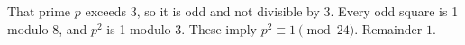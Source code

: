 That prime $p$ exceeds 3, so it is odd and not divisible by 3. Every odd square is 1 modulo 8, and $p^2$ is 1 modulo 3. These imply $p^2\equiv1\pmod{24}$. Remainder $\boxed1$.
